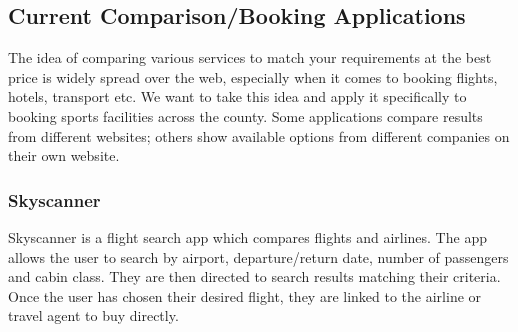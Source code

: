 \subsection{Current Comparison/Booking Applications}
\label{sub:current_comparison_applications}

The idea of comparing various services to match your requirements at the best
price is widely spread over the web, especially when it comes to booking
flights, hotels, transport etc.  We want to take this idea and apply it
specifically to booking sports facilities across the county.  Some applications
compare results from different websites; others show available options from
different companies on their own website.

\subsubsection{Skyscanner}
\label{ssub:skyscanner}

Skyscanner is a flight search app which compares flights and airlines. The app
allows the user to search by airport, departure/return date, number of
passengers and cabin class. They are then directed to search results matching
their criteria. Once the user has chosen their desired flight, they are linked
to the airline or travel agent to buy directly.


